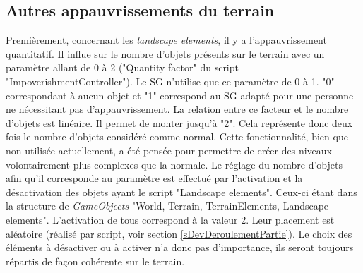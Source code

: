 		\begin{minipage}{\linewidth}
			\label{TerrainGeometryImpoverishment}
		\end{minipage}\medskip		
		
	\subsection*{Autres appauvrissements du terrain}
		
		Premièrement, concernant les \textit{landscape elements}, il y a l'appauvrissement quantitatif. Il influe sur le nombre d'objets présents sur le terrain avec un paramètre allant de 0 à 2 ("Quantity factor" du script "ImpoverishmentController"). Le SG n'utilise que ce paramètre de 0 à 1. "0" correspondant à aucun objet et "1" correspond au SG adapté pour une personne ne nécessitant pas d'appauvrissement. La relation entre ce facteur et le nombre d'objets est linéaire. Il permet de monter jusqu'à "2". Cela représente donc deux fois le nombre d'objets considéré comme normal. Cette fonctionnalité, bien que non utilisée actuellement, a été pensée pour permettre de créer des niveaux volontairement plus complexes que la normale. Le réglage du nombre d'objets afin qu'il corresponde au paramètre est effectué par l'activation et la désactivation des objets ayant le script "Landscape elements". Ceux-ci étant dans la structure de \textit{GameObjects} "World, Terrain, TerrainElements, Landscape elements". L'activation de tous correspond à la valeur 2. Leur placement est aléatoire (réalisé par script, voir section \ref{sDevDeroulementPartie}). Le choix des éléments à désactiver ou à activer n'a donc pas d'importance, ils seront toujours répartis de façon cohérente sur le terrain.
		
